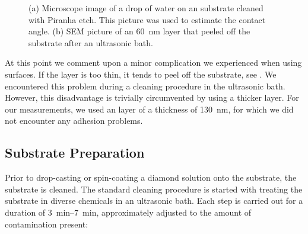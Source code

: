 	\begin{figure}[tp]
		\begin{subfigure}[t]{ 0.49\linewidth}
			\caption{}\label{subfig::wetting}
			\centering
		\end{subfigure}
		\hfill
		\begin{subfigure}[t]{ 0.49\linewidth}
			\caption{}\label{subfig::peeled_ir}
			\centering
		\end{subfigure}
		\caption[Details for \ir substrates]{(a) Microscope image of a drop of water on an \ir substrate cleaned with Piranha etch. This picture was used to estimate the contact angle. (b) SEM picture of an \SI{60}{nm} \ir layer that peeled off the substrate after an ultrasonic bath.}
		\label{fig::sem_substrates}
	\end{figure}

	At this point we comment upon a minor complication we experienced when using \ir surfaces.
	If the \ir layer is too thin, it tends to peel off the substrate, see .
	We encountered this problem during a cleaning procedure in the ultrasonic bath.
	However, this disadvantage is trivially circumvented by using a thicker \ir layer.
	For our measurements, we used an \ir layer of a thickness of \SI{130}{nm}, for which we did not encounter any adhesion problems.

	\subsection{Substrate Preparation}

		Prior to drop-casting or spin-coating a diamond solution onto the \ir substrate, the substrate is cleaned.
		The standard cleaning procedure is started with treating the substrate in diverse chemicals in an ultrasonic bath.
		Each step is carried out for a duration of \SIrange{3}{7}{\minute}, approximately adjusted to the amount of contamination present:

